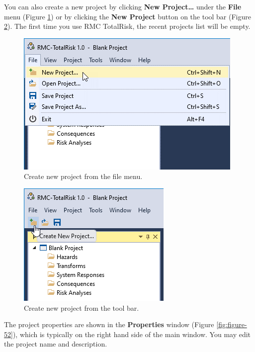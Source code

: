 \documentclass[
]{book}
\begin{document}
You can also create a new project by clicking \textbf{New Project\ldots{}} under the \textbf{File} menu (Figure \ref{fig:figure-50}) or by clicking the \textbf{New Project} button on the tool bar (Figure \ref{fig:figure-51}). The first time you use RMC TotalRisk, the recent projects list will be empty.

\begin{figure}

{\centering \includegraphics{images/figure50} 

}

\caption{Create new project from the file menu.}\label{fig:figure-50}
\end{figure}

\begin{figure}

{\centering \includegraphics{images/figure51} 

}

\caption{Create new project from the tool bar.}\label{fig:figure-51}
\end{figure}

The project properties are shown in the \textbf{Properties} window (Figure \ref{fig:figure-52}), which is typically on the right hand side of the main window. You may edit the project name and description.
\end{document}
